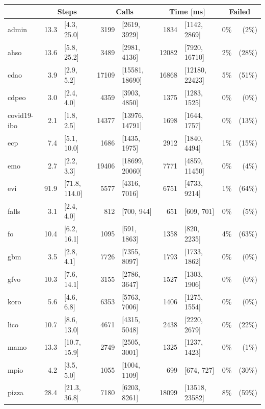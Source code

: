\begin{table}[ht]
  \scriptsize
  \centering
  \begin{tabular}{|l|r@{ }lr@{ }lr@{ }lr@{ }r|}
    \cline{2-9}
    \multicolumn{1}{l|}{} & \multicolumn{2}{c}{Steps} & \multicolumn{2}{c}{Calls} & \multicolumn{2}{c}{Time [ms]} & \multicolumn{2}{c|}{Failed} \\
    \hline
    admin & 13.3 & [4.3, 25.0] & 3199 & [2619, 3929] & 1834 & [1142, 2869] & 0\% & (2\%) \\
    ahso & 13.6 & [5.8, 25.2] & 3489 & [2981, 4136] & 12082 & [7920, 16710] & 2\% & (28\%) \\
    cdao & 3.9 & [2.9, 5.2] & 17109 & [15581, 18690] & 16868 & [12180, 22423] & 5\% & (51\%) \\
    cdpeo & 3.0 & [2.4, 4.0] & 4359 & [3903, 4850] & 1375 & [1283, 1525] & 0\% & (0\%) \\
    covid19-ibo & 2.1 & [1.8, 2.5] & 14377 & [13976, 14791] & 1698 & [1644, 1757] & 0\% & (13\%) \\
    ecp & 7.4 & [5.1, 10.0] & 1686 & [1435, 1975] & 2912 & [1840, 4494] & 1\% & (15\%) \\
    emo & 2.7 & [2.2, 3.3] & 19406 & [18699, 20060] & 7771 & [4859, 11450] & 0\% & (4\%) \\
    evi & 91.9 & [71.8, 114.0] & 5577 & [4316, 7016] & 6751 & [4733, 9214] & 1\% & (64\%) \\
    falls & 3.1 & [2.4, 4.0] & 812 & [700, 944] & 651 & [609, 701] & 0\% & (5\%) \\
    fo & 10.4 & [6.2, 16.1] & 1095 & [591, 1863] & 1358 & [820, 2235] & 4\% & (63\%) \\
    gbm & 3.5 & [2.8, 4.1] & 7726 & [7355, 8097] & 1793 & [1733, 1862] & 0\% & (0\%) \\
    gfvo & 10.3 & [7.6, 14.1] & 3155 & [2786, 3647] & 1527 & [1303, 1906] & 0\% & (0\%) \\
    koro & 5.6 & [4.6, 6.8] & 6353 & [5763, 7006] & 1406 & [1275, 1554] & 0\% & (0\%) \\
    lico & 10.7 & [8.6, 13.0] & 4671 & [4315, 5048] & 2438 & [2220, 2679] & 0\% & (22\%) \\
    mamo & 13.3 & [10.7, 15.9] & 2749 & [2505, 3001] & 1325 & [1237, 1423] & 0\% & (1\%) \\
    mpio & 4.2 & [3.5, 5.0] & 1055 & [1004, 1109] & 699 & [674, 727] & 0\% & (30\%) \\
    pizza & 28.4 & [21.3, 36.8] & 7180 & [6203, 8261] & 18099 & [13518, 23582] & 8\% & (59\%) \\

\end{tabular}
\end{table}
